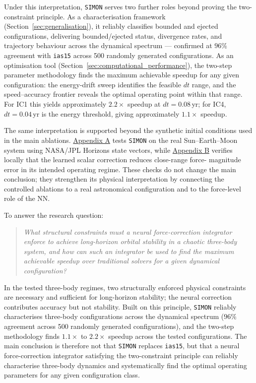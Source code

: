 \documentclass[12pt]{article}
\begin{document}
Under this interpretation, \texttt{SIMON} serves two further roles beyond
proving the two-constraint principle. As a characterisation framework
(Section~\ref{sec:generalisation}), it reliably classifies bounded and ejected
configurations, delivering bounded/ejected status, divergence rates, and trajectory
behaviour across the dynamical spectrum --- confirmed at $96\%$ agreement with
\texttt{ias15} across 500 randomly generated configurations. As an optimisation
tool (Section~\ref{sec:computational_performance}), the two-step parameter
methodology finds the maximum achievable speedup for any given configuration:
the energy-drift sweep identifies the feasible $dt$ range, and the speed--accuracy
frontier reveals the optimal operating point within that range. For IC1 this
yields approximately $2.2\times$ speedup at $dt=0.08$\,yr; for IC4,
$dt=0.04$\,yr is the energy threshold, giving approximately $1.1\times$ speedup.

The same interpretation is supported beyond the synthetic initial conditions used in the main ablations. \hyperref[app:real_system_validation]{Appendix A} tests \texttt{SIMON}
on the real Sun--Earth--Moon system using NASA/JPL Horizons
state vectors, while
\hyperref[app:force_level_nn_validation]{Appendix B} verifies locally
that the learned scalar correction reduces close-range force-
magnitude error in its intended operating regime. These checks do not change the main conclusion; they strengthen its physical interpretation by connecting the controlled ablations to a real astronomical configuration and to the force-level role of the NN.

To answer the research question:
\begin{quote}

\emph{What structural constraints must a neural force-correction integrator enforce
to achieve long-horizon orbital stability in a chaotic three-body system, and how
can such an integrator be used to find the maximum achievable speedup over
traditional solvers for a given dynamical configuration?}

\end{quote}

\noindent In the tested three-body regimes, two structurally enforced physical
constraints are necessary and sufficient for long-horizon stability; the neural
correction contributes accuracy but not stability. Built on this principle,
\texttt{SIMON} reliably characterises three-body configurations across the
dynamical spectrum ($96\%$ agreement across 500 randomly generated
configurations), and the two-step methodology finds $1.1\times$ to $2.2\times$
speedup across the tested configurations. The main conclusion is therefore not
that \texttt{SIMON} replaces \texttt{ias15}, but that a neural force-correction
integrator satisfying the two-constraint principle can reliably characterise
three-body dynamics and systematically find the optimal operating parameters for
any given configuration class.
\end{document}
